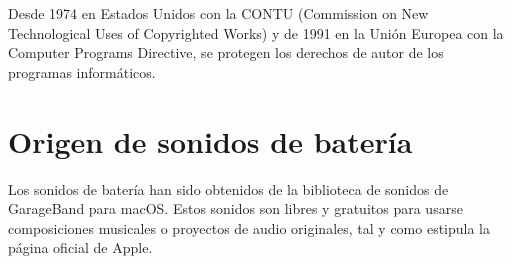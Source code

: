             Desde 1974 en Estados Unidos con la CONTU\cite{contu} (Commission on New Technological Uses of Copyrighted
            Works) y de 1991 en la Unión Europea con la Computer Programs Directive\cite{com_pro_dir}, se protegen los
            derechos de autor de los programas informáticos.

    

    \section{Origen de sonidos de batería} %
    \label{sec:OrigenDeSonidosDeBateria}

        Los sonidos de batería han sido obtenidos de la biblioteca de sonidos de GarageBand para macOS\cite{garageband}.
        Estos sonidos son libres y gratuitos para usarse composiciones musicales o proyectos de audio originales, tal y
        como estipula la página oficial de Apple\cite{support_garageband}.



\newpage

